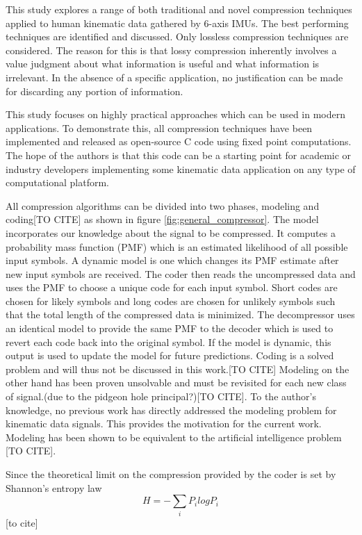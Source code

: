 \documentclass[journal]{IEEEtran}
\begin{document}
This study explores a range of both traditional and novel compression techniques applied to human kinematic data gathered by 6-axis IMUs. The best performing techniques are identified and discussed. Only lossless compression techniques are considered. The reason for this is that lossy compression inherently involves a value judgment about what information is useful and what information is irrelevant. In the absence of a specific application, no justification can be made for discarding any portion of information.

This study focuses on highly practical approaches which can be used in modern applications. To demonstrate this, all compression techniques have been implemented and released as open-source C code using fixed point computations. The hope of the authors is that this code can be a starting point for academic or industry developers implementing some kinematic data application on any type of computational platform.

All compression algorithms can be divided into two phases, modeling and coding[TO CITE] as shown in figure \ref{fig:general_compressor}. The model incorporates our knowledge about the signal to be compressed. It computes a probability mass function (PMF) which is an estimated likelihood of all possible input symbols. A dynamic model is one which changes its PMF estimate after new input symbols are received. The coder then reads the uncompressed data and uses the PMF to choose a unique code for each input symbol. Short codes are chosen for likely symbols and long codes are chosen for unlikely symbols such that the total length of the compressed data is minimized. The decompressor uses an identical model to provide the same PMF to the decoder which is used to revert each code back into the original symbol. If the model is dynamic, this output is used to update the model for future predictions. Coding is a solved problem and will thus not be discussed in this work.[TO CITE] Modeling on the other hand has been proven unsolvable and must be revisited for each new class of signal.(due to the pidgeon hole principal?)[TO CITE]. To the author's knowledge, no previous work has directly addressed the modeling problem for kinematic data signals. This provides the motivation for the current work. Modeling has been shown to be equivalent to the artificial intelligence problem [TO CITE].

Since the theoretical limit on the compression provided by the coder is set by Shannon's entropy law
$$H = -\sum_{i} P_ilogP_i$$
[to cite]
\end{document}
